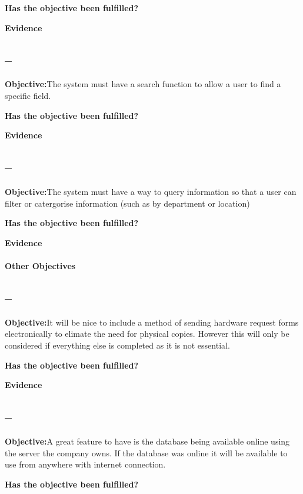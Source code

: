 \textbf{Has the objective been fulfilled?}

\textbf{Evidence}

\subsection{--}

\textbf{Objective:}The system must have a search function to allow a user to find a specific field.

\textbf{Has the objective been fulfilled?}

\textbf{Evidence}

\subsection{--}

\textbf{Objective:}The system must have a way to query information so that a user can filter or catergorise information (such as by department or location)

\textbf{Has the objective been fulfilled?}

\textbf{Evidence}


\paragraph{Other Objectives}

\subsection{--}

\textbf{Objective:}It will be nice to include a method of sending hardware request forms electronically to elimate the need for physical copies. However this will only be considered if everything else is completed as it is not essential.

\textbf{Has the objective been fulfilled?}

\textbf{Evidence}

\subsection{--}

\textbf{Objective:}A great feature to have is the database being available online using the server the company owns. If the database was online it will be available to use from anywhere with internet connection.

\textbf{Has the objective been fulfilled?}


